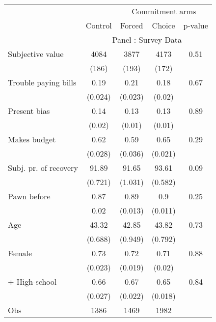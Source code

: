 \begin{tabular}{lcccc}
\toprule
      &       & \multicolumn{3}{c}{Commitment arms} \\
\cmidrule{3-5}      & \multicolumn{1}{p{4.5em}}{Control} & \multicolumn{1}{p{4.93em}}{Forced} & \multicolumn{1}{p{3.43em}}{Choice} & \multicolumn{1}{p{3.43em}}{p-value} \\
\midrule
      & \multicolumn{4}{c}{Panel : Survey Data} \\
\midrule
\midrule
Subjective value & 4084  & 3877  & 4173  & 0.51 \\
      & (186) & (193) & (172) &  \\
Trouble paying bills & 0.19  & 0.21  & 0.18  & 0.67 \\
      & (0.024) & (0.023) & (0.02) &  \\
Present bias & 0.14  & 0.13  & 0.13  & 0.89 \\
      & (0.02) & (0.01) & (0.01) &  \\
Makes budget & 0.62  & 0.59  & 0.65  & 0.29 \\
      & (0.028) & (0.036) & (0.021) &  \\
Subj. pr. of recovery & 91.89 & 91.65 & 93.61 & 0.09 \\
      & (0.721) & (1.031) & (0.582) &  \\
Pawn before & 0.87  & 0.89  & 0.9   & 0.25 \\
      & 0.02  & (0.013) & (0.011) &  \\
Age   & 43.32 & 42.85 & 43.82 & 0.73 \\
      & (0.688) & (0.949) & (0.792) &  \\
Female & 0.73  & 0.72  & 0.71  & 0.88 \\
      & (0.023) & (0.019) & (0.02) &  \\
+ High-school & 0.66  & 0.67  & 0.65  & 0.84 \\
      & (0.027) & (0.022) & (0.018) &  \\
\midrule
Obs   & 1386  & 1469  & 1982  &  \\
\bottomrule
\bottomrule
\end{tabular}%
